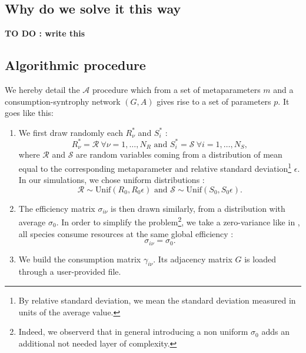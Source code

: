 \documentclass[12pt]{report}
\begin{document}
\subsection{Why do we solve it this way}\label{sec: explanation solve for d and m}
\textbf{TO DO : write this}
\subsection{Algorithmic procedure}\label{sec : feasibility methods algorithmic procedure}
We hereby detail the $\mathcal{A}$ procedure which from a set of metaparameters $m$ and a consumption-syntrophy network $(G,A)$ gives rise to a set of parameters $p$. It goes like this:
\begin{enumerate}
  \item We first draw randomly each $R^*_\nu$
  and $S^*_i$ :
  \begin{equation}
     R^*_\nu = \mathcal{R} \ \forall \nu=1, \dots, N_R\text{ and }  S^*_i = \mathcal{S} \ \forall i=1, \dots, N_S,
  \end{equation}
  where $\mathcal{R}$ and $\mathcal{S}$ are random variables coming from a distribution of mean equal to the corresponding metaparameter and relative standard deviation\footnote{By relative standard deviation, we mean the standard deviation measured in units of the average value.} $\epsilon$. In our simulations, we chose uniform distributions :
  \begin{equation}
  \mathcal{R} \sim \text{Unif}(R_0, R_0 \epsilon) \text{ and } \mathcal{S} \sim \text{Unif}(S_0, S_0\epsilon).
  \end{equation}
  \item The efficiency matrix $\sigma_{i\nu}$ is then drawn similarly, from a distribution with average $\sigma_0$. In order to simplify the problem\footnote{Indeed, we observerd that in general introducing a non uniform $\sigma_0$ adds an additional not needed layer of complexity.}, we take a zero-variance like \citeauthor{butler_stability_2018} in \cite{butler_stability_2018}, \ie all species consume resources at the same global efficiency :
  \begin{equation}
    \sigma_{i\nu} = \sigma_0.
  \end{equation}
  \item We build the consumption matrix $\gamma_{i\nu}$. Its adjacency matrix $G$ is loaded through a user-provided file.

\end{enumerate}
\end{document}
